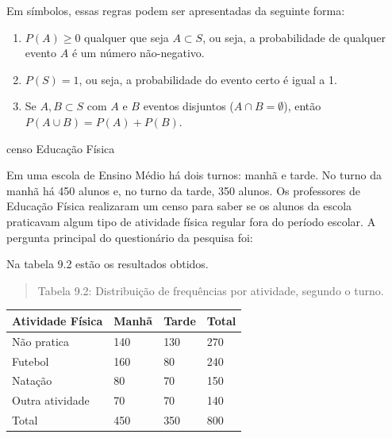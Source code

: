 Em símbolos, essas regras podem ser apresentadas da seguinte forma:
\begin{enumerate}
\item {} 
\(P(A)\geq 0\) qualquer que seja \(A\subset S\), ou seja, a probabilidade de qualquer evento \(A\) é um número não-negativo.

\item {} 
\(P(S)=1\), ou seja, a probabilidade do evento certo é igual a 1.

\item {} 
Se \(A,B\subset S\) com \(A\) e \(B\) eventos disjuntos (\(A\cap B=\emptyset\)), então \(P(A\cup B)=P(A)+P(B)\).

\end{enumerate}
\begin{task}{censo Educação Física}
\label{ativ-probabilidade-atividade-fisica}

Em uma escola de Ensino Médio há dois turnos: manhã e tarde. No turno da manhã há 450 alunos e, no turno da tarde, 350 alunos. Os professores de Educação Física realizaram um censo para saber se os alunos da escola praticavam algum tipo de atividade física regular fora do período escolar. A pergunta principal do questionário da pesquisa foi:



Na tabela 9.2 estão os resultados obtidos.
\begin{quote}

Tabela 9.2: Distribuição de frequências por atividade, segundo o turno.
\end{quote}


\begin{savenotes}\sphinxattablestart
\centering
\begin{tabulary}{\linewidth}[t]{|T|T|T|T|}
\hline

Atividade Física
&
Manhã
&
Tarde
&
Total
\\
\hline
Não pratica
&
140
&
130
&
270
\\
\hline
Futebol
&
160
&
80
&
240
\\
\hline
Natação
&
80
&
70
&
150
\\
\hline
Outra atividade
&
70
&
70
&
140
\\
\hline
Total
&
450
&
350
&
800
\\
\hline
\end{tabulary}
\par
\sphinxattableend\end{savenotes}


\end{task}
